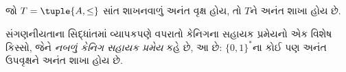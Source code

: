 \documentclass[../../../include/open-logic-section]{subfiles}
\begin{document}
\begin{prop}[કેનિગનું સહાયક પ્રમેય]
જો $T = \tuple{A,\le}$ સાંત શાખનવાળું અનંત વૃક્ષ હોય,
તો $T$ને અનંત શાખા હોય છે.
\end{prop}

સંગણનીયતાના સિદ્ધાંતમાં વ્યાપકપણે વપરાતો કેનિગના સહાયક
પ્રમેયનો એક વિશેષ કિસ્સો, જેને \emph{નબળું કેનિગ સહાયક પ્રમેય}
કહે છે, આ છે: $\{0,1\}^*$ના કોઈ પણ અનંત ઉપવૃક્ષને
અનંત શાખા હોય છે.
\end{document}
